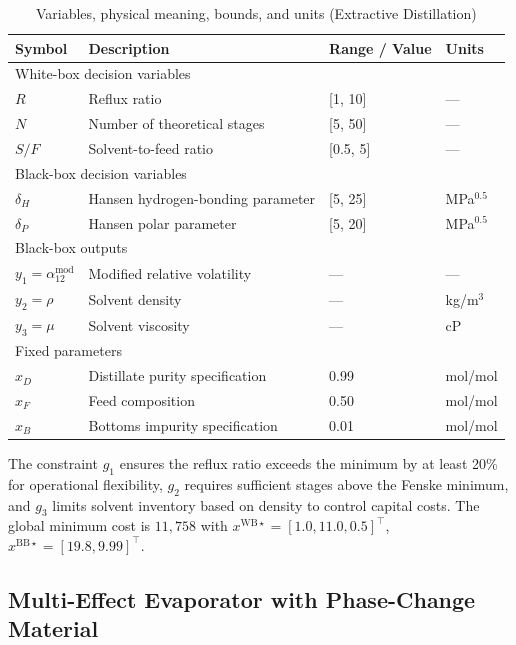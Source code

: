 \documentclass[12pt,a4paper]{article}%
\theoremstyle{plain}%
\theoremstyle{remark}%
\theoremstyle{definition}%
\def\WB{\mathrm{WB}}
\def\BB{\mathrm{BB}}
\begin{document}
\begin{appendices}
\begin{table}[htbp]
\centering
\caption{Variables, physical meaning, bounds, and units (Extractive Distillation)}
\label{tab:distillation_vars}
\begin{tabular}{@{}llll@{}}
\toprule
\textbf{Symbol} & \textbf{Description} & \textbf{Range / Value} & \textbf{Units} \\
\midrule
\multicolumn{4}{l}{White-box decision variables} \\
\midrule
$R$ & Reflux ratio & [1, 10] & --- \\
$N$ & Number of theoretical stages & [5, 50] & --- \\
$S/F$ & Solvent-to-feed ratio & [0.5, 5] & --- \\
\midrule
\multicolumn{4}{l}{Black-box decision variables} \\
\midrule
$\delta_H$ & Hansen hydrogen-bonding parameter & [5, 25] & MPa$^{0.5}$ \\
$\delta_P$ & Hansen polar parameter & [5, 20] & MPa$^{0.5}$ \\
\midrule
\multicolumn{4}{l}{Black-box outputs} \\
\midrule
$y_1 = \alpha_{12}^{\text{mod}}$ & Modified relative volatility & --- & --- \\
$y_2 = \rho$ & Solvent density & --- & kg/m$^3$ \\
$y_3 = \mu$ & Solvent viscosity & --- & cP \\
\midrule
\multicolumn{4}{l}{Fixed parameters} \\
\midrule
$x_D$ & Distillate purity specification & 0.99 & mol/mol \\
$x_F$ & Feed composition & 0.50 & mol/mol \\
$x_B$ & Bottoms impurity specification & 0.01 & mol/mol \\
\bottomrule
\end{tabular}
\end{table}

The constraint $g_1$ ensures the reflux ratio exceeds the minimum by at least 20\% for operational flexibility, $g_2$ requires sufficient stages above the Fenske minimum, and $g_3$ limits solvent inventory based on density to control capital costs. The global minimum cost is $11{,}758$ with $x^{\WB\star} = [1.0, 11.0, 0.5]^\top$, $x^{\BB\star} = [19.8, 9.99]^\top$.

\subsection{Multi-Effect Evaporator with Phase-Change Material}\label{subsec:app_evaporator}


\end{appendices}
\end{document}
